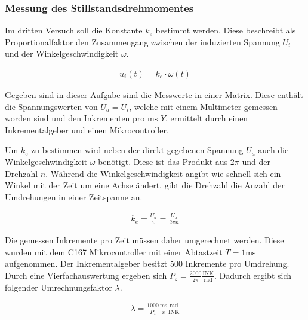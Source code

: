 \subsubsection{Messung des Stillstandsdrehmomentes}

Im dritten Versuch soll die Konstante $k_e$ bestimmt werden. Diese
beschreibt als Proportionalfaktor den Zusammengang zwischen der
induzierten Spannung $U_i$ und der Winkelgeschwindigkeit $\omega$.

\begin{equation} \label{eq131}
    \begin{split}
        u_i(t)=k_e \cdot \omega (t)
    \end{split}
\end{equation}

Gegeben sind in dieser Aufgabe sind die Messwerte in einer Matrix. Diese
enthält die Spannungswerten von $U_a=U_i$, welche mit einem Multimeter
gemessen worden sind und den Inkrementen pro $\mathrm{ms}$ $Y$, ermittelt
durch einen Inkrementalgeber und einen Mikrocontroller.

Um $k_e$ zu bestimmen wird neben der direkt gegebenen Spannung $U_a$ auch
die Winkelgeschwindigkeit $\omega$ benötigt. Diese ist das Produkt aus
$2\pi$ und der Drehzahl $n$. Während die Winkelgeschwindigkeit angibt wie
schnell sich ein Winkel mit der Zeit um eine Achse ändert, gibt die Drehzahl
die Anzahl der Umdrehungen in einer Zeitspanne an.

\begin{equation} \label{eq132}
    \begin{split}
        k_e = \frac{U_a}{\omega}= \frac{U_a}{2 \pi n}
    \end{split}
\end{equation}

Die gemessen Inkremente pro Zeit müssen daher umgerechnet werden. Diese
wurden mit dem C167 Mikrocontroller mit einer Abtastzeit $T=1\mathrm{ms}$
aufgenommen. Der Inkrementalgeber besitzt 500 Inkremente pro Umdrehung.
Durch eine Vierfachauswertung ergeben sich $P_z=\frac{2000}{2\pi} \mathrm{\frac{INK}{rad}}$.
Dadurch ergibt sich folgender Umrechnungsfaktor $\lambda$.

\begin{equation} \label{eq133}
    \begin{split}
        \lambda = \frac{1000}{P_z} \mathrm{\frac{ms}{s} \frac{rad}{INK}}
    \end{split}
\end{equation}

